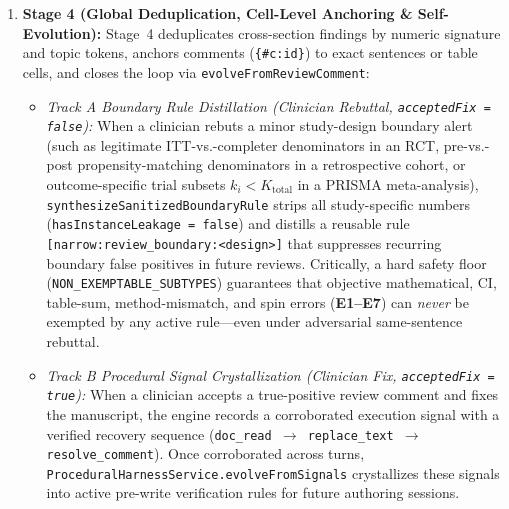 \documentclass[11pt,a4paper]{article}
\begin{document}
\begin{enumerate}[leftmargin=1.5em,itemsep=2pt]
\begin{itemize}[leftmargin=1.2em,itemsep=1pt]
    \item \emph{Pass C (Statistical Method--Result Pairing):} Detects (\textbf{E5}) mismatches between declared statistical methods and reported results (e.g., declaring parametric mean $\pm$ SD / $t$-test / ANOVA in Methods while reporting non-parametric Median [IQR] / Mann--Whitney / Kruskal--Wallis in Results or vice versa, Pearson vs.\ Spearman correlation conflicts, SD vs.\ SEM confusion, and abbreviation definition conflicts).
    \item \emph{Pass D (Spin Bias \& Reporting Guideline Compliance):} Detects (\textbf{E6}) positive efficacy spin when statistical tests are non-significant ($p \ge 0.05$) and causal overclaims in observational cohorts or non-significant endpoints under CONSORT, STROBE, PRISMA, and STARD guidelines.
  \end{itemize}
  \item \textbf{Stage 4 (Global Deduplication, Cell-Level Anchoring \& Self-Evolution):} Stage~4 deduplicates cross-section findings by numeric signature and topic tokens, anchors comments (\texttt{\{\#c:id\}}) to exact sentences or table cells, and closes the loop via \texttt{evolveFromReviewComment}:
  \begin{itemize}[leftmargin=1.2em,itemsep=1pt]
    \item \emph{Track A Boundary Rule Distillation (Clinician Rebuttal, \texttt{acceptedFix = false}):} When a clinician rebuts a minor study-design boundary alert (such as legitimate ITT-vs.-completer denominators in an RCT, pre-vs.-post propensity-matching denominators in a retrospective cohort, or outcome-specific trial subsets $k_i < K_{\text{total}}$ in a PRISMA meta-analysis), \texttt{synthesizeSanitizedBoundaryRule} strips all study-specific numbers (\texttt{hasInstanceLeakage = false}) and distills a reusable rule \texttt{[narrow:review\_boundary:<design>]} that suppresses recurring boundary false positives in future reviews. Critically, a hard safety floor (\texttt{NON\_EXEMPTABLE\_SUBTYPES}) guarantees that objective mathematical, CI, table-sum, method-mismatch, and spin errors (\textbf{E1--E7}) can \emph{never} be exempted by any active rule---even under adversarial same-sentence rebuttal.
    \item \emph{Track B Procedural Signal Crystallization (Clinician Fix, \texttt{acceptedFix = true}):} When a clinician accepts a true-positive review comment and fixes the manuscript, the engine records a corroborated execution signal with a verified recovery sequence (\texttt{doc\_read $\to$ replace\_text $\to$ resolve\_comment}). Once corroborated across turns, \texttt{ProceduralHarnessService.evolveFromSignals} crystallizes these signals into active pre-write verification rules for future authoring sessions.
  \end{itemize}
\end{enumerate}
\end{document}
